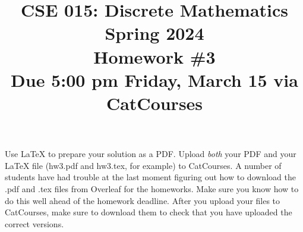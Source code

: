 \documentclass[11pt]{article}
\begin{document}
\title{\vspace{-1.5cm}CSE 015: Discrete Mathematics\\
Spring 2024\\
Homework \#3\\
Due 5:00 pm Friday, March 15 via CatCourses}
\date{}
\maketitle
\vspace{-1.5cm}
\noindent Use LaTeX to prepare your solution as a PDF. Upload \emph{both} your PDF
and your LaTeX file (hw3.pdf and hw3.tex, for example) to CatCourses. A number of
students have had trouble at the last moment figuring out how to download the .pdf
and .tex files from Overleaf for the homeworks. Make sure you know how to do this
well ahead of the homework deadline. After you upload your files to CatCourses,
make sure to download them to check that you have uploaded the correct versions.
\end{document}
